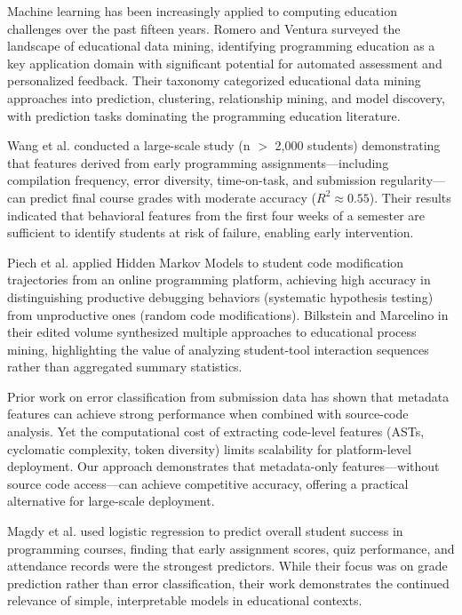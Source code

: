 \documentclass[10pt,a4paper]{article}
\begin{document}
Machine learning has been increasingly applied to computing education
challenges over the past fifteen years. Romero and Ventura
\cite{romero2013data} surveyed the landscape of educational data mining,
identifying programming education as a key application domain with
significant potential for automated assessment and personalized feedback.
Their taxonomy categorized educational data mining approaches into prediction,
clustering, relationship mining, and model discovery, with prediction tasks
dominating the programming education literature.

Wang et al. \cite{wang2017learning} conducted a large-scale study (n $>$ 2,000
students) demonstrating that features derived from early programming
assignments---including compilation frequency, error diversity, time-on-task,
and submission regularity---can predict final course grades with moderate
accuracy ($R^2 \approx 0.55$). Their results indicated that behavioral
features from the first four weeks of a semester are sufficient to identify
students at risk of failure, enabling early intervention.

Piech et al. \cite{effenberger2021validity} applied Hidden Markov Models to student
code modification trajectories from an online programming platform, achieving
high accuracy in distinguishing productive debugging behaviors (systematic
hypothesis testing) from unproductive ones (random code modifications).
Bilkstein and Marcelino in their edited volume \cite{romero2013data}
synthesized multiple approaches to educational process mining, highlighting the
value of analyzing student-tool interaction sequences rather than aggregated
summary statistics.

Prior work on error classification from submission data has shown that
metadata features can achieve strong performance when combined with
source-code analysis. Yet the computational cost of extracting
code-level features (ASTs, cyclomatic complexity, token diversity)
limits scalability for platform-level deployment. Our approach demonstrates
that metadata-only features---without source code access---can achieve
competitive accuracy, offering a practical alternative for large-scale
deployment.

Magdy et al. \cite{alnahhas2020predicting} used logistic regression to predict
overall student success in programming courses, finding that early assignment
scores, quiz performance, and attendance records were the strongest predictors.
While their focus was on grade prediction rather than error classification,
their work demonstrates the continued relevance of simple, interpretable models
in educational contexts.
\end{document}
